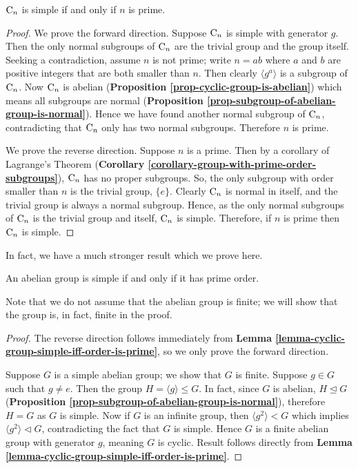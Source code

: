 \begin{lemma}\label{lemma-cyclic-group-simple-iff-order-is-prime}
    $\mathrm{C}_{n}$ is simple if and only if $n$ is prime.
\end{lemma}

\begin{proof}
    We prove the forward direction. Suppose $\mathrm{C}_{n}$ is simple with generator $g$. Then the only normal subgroups of $\mathrm{C}_{n}$ are the trivial group and the group itself. Seeking a contradiction, assume $n$ is not prime; write $n = ab$ where $a$ and $b$ are positive integers that are both smaller than $n$. Then clearly $\langle g^a\rangle$ is a subgroup of $\mathrm{C}_{n}$. Now $\mathrm{C}_{n}$ is abelian (\textbf{Proposition \ref{prop-cyclic-group-is-abelian}}) which means all subgroups are normal (\textbf{Proposition \ref{prop-subgroup-of-abelian-group-is-normal}}). Hence we have found another normal subgroup of $\mathrm{C}_{n}$, contradicting that $\mathrm{C}_{n}$ only has two normal subgroups. Therefore $n$ is prime.
    
    We prove the reverse direction. Suppose $n$ is a prime. Then by a corollary of Lagrange's Theorem (\textbf{Corollary \ref{corollary-group-with-prime-order-subgroups}}), $\mathrm{C}_{n}$ has no proper subgroups. So, the only subgroup with order smaller than $n$ is the trivial group, $\{e\}$. Clearly $\mathrm{C}_{n}$ is normal in itself, and the trivial group is always a normal subgroup. Hence, as the only normal subgroups of $\mathrm{C}_{n}$ is the trivial group and itself, $\mathrm{C}_{n}$ is simple. Therefore, if $n$ is prime then $\mathrm{C}_{n}$ is simple.
\end{proof}

In fact, we have a much stronger result which we prove here.
\begin{theorem}\label{thrm-abelian-group-simple-iff-cylic-group-of-prime-order}
    An abelian group is simple if and only if it has prime order.
\end{theorem}
Note that we do not assume that the abelian group is finite; we will show that the group is, in fact, finite in the proof.
\begin{proof}
    The reverse direction follows immediately from \textbf{Lemma \ref{lemma-cyclic-group-simple-iff-order-is-prime}}, so we only prove the forward direction.
    
    Suppose $G$ is a simple abelian group; we show that $G$ is finite. Suppose $g \in G$ such that $g \neq e$. Then the group $H = \langle g \rangle \leq G$. In fact, since $G$ is abelian, $H \unlhd G$ (\textbf{Proposition \ref{prop-subgroup-of-abelian-group-is-normal}}), therefore $H = G$ as $G$ is simple. Now if $G$ is an infinite group, then $\langle g^2 \rangle < G$ which implies $\langle g^2 \rangle \lhd G$, contradicting the fact that $G$ is simple. Hence $G$ is a finite abelian group with generator $g$, meaning $G$ is cyclic. Result follows directly from \textbf{Lemma \ref{lemma-cyclic-group-simple-iff-order-is-prime}}.
\end{proof}

